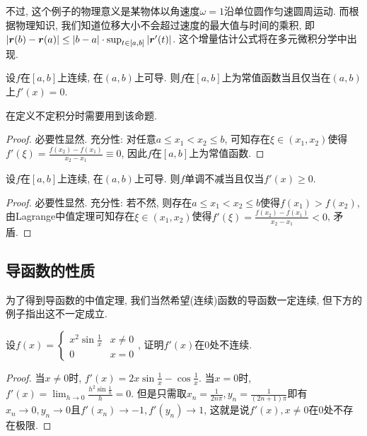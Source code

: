 不过, 这个例子的物理意义是某物体以角速度$\omega =1$沿单位圆作匀速圆周运动. 而根据物理知识, 我们知道位移大小不会超过速度的最大值与时间的乘积, 即$|\boldsymbol{r}(b)-\boldsymbol{r}(a)| \leq |b-a| \cdot \sup_{t\in [a,b]} |\boldsymbol{r}'(t)|$. 这个增量估计公式将在多元微积分学中出现. 

\begin{corollary}{}
	设$f$在$[a,b]$上连续, 在$(a,b)$上可导. 则$f$在$[a,b]$上为常值函数当且仅当在$(a,b)$上$f'(x)=0$. 
\end{corollary}
\begin{remark}
	在定义不定积分时需要用到该命题. 
\end{remark}
\begin{proof}
	必要性显然. 充分性: 对任意$a \leq x_1 < x_2 \leq b$, 可知存在$\xi \in (x_1,x_2)$使得$f'(\xi) = \frac{f(x_2)-f(x_1)}{x_2-x_1} \equiv 0$, 因此$f$在$[a,b]$上为常值函数. 
\end{proof}

\begin{corollary}{}
	设$f$在$[a,b]$上连续, 在$(a,b)$上可导. 则$f$单调不减当且仅当$f'(x) \geq 0$. 
\end{corollary}
\begin{proof}
	必要性显然. 充分性: 若不然, 则存在$a \leq x_1 < x_2 \leq b$使得$f(x_1) > f(x_2)$, 由Lagrange中值定理可知存在$\xi \in (x_1,x_2)$使得$f'(\xi) = \frac{f(x_2)-f(x_1)}{x_2-x_1} <0$, 矛盾. 
\end{proof}

\subsection{导函数的性质}

为了得到导函数的中值定理, 我们当然希望(连续)函数的导函数一定连续, 但下方的例子指出这不一定成立. 

\begin{example}
	设$f(x) = \begin{cases}
		x^2\sin \frac{1}{x} & x \neq 0 \\ 0 & x=0
	\end{cases}$, 证明$f'(x)$在$0$处不连续. 
\end{example}
\begin{proof}
	当$x \neq 0$时, $f'(x) = 2x\sin \frac{1}{x}-\cos \frac{1}{x}$. 当$x = 0$时, $f'(x) = \lim_{h \to 0} \frac{h^2\sin \frac{1}{h}}{h} = 0$. 但是只需取$x_n = \frac{1}{2n\pi}, y_n = \frac{1}{(2n+1)\pi}$即有$x_n \to 0,y_n \to 0$且$f'(x_n) \to -1, f'(y_n) \to 1$, 这就是说$f'(x), x \neq 0$在$0$处不存在极限. 
\end{proof}

